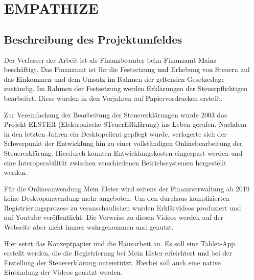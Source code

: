 


\section{EMPATHIZE}\label{EMPATHIZE}
\subsection{Beschreibung des Projektumfeldes}\label{Beschreibung des Projektumfeldes}
Der Verfasser der Arbeit ist als Finanzbeamter beim Finanzamt Mainz beschäftigt.
Das Finanzamt ist für die Festsetzung und Erhebung von Steuern auf das Einkommen und dem Umsatz im Rahmen der geltenden Gesetzeslage zuständig. Im Rahmen der Festsetzung werden Erklärungen der Steuerpflichtigen bearbeitet. Diese wurden in den Vorjahren auf Papiervordrucken erstellt. 

Zur Vereinfachung der Bearbeitung der Steuererklärungen wurde 2003 das Projekt ELSTER (\grq{}Elektronische STeuerERklärung\grq{}) ins Leben gerufen. Nachdem in den letzten Jahren ein Desktopclient gepflegt wurde, verlagerte sich der Schwerpunkt der Entwicklung hin zu einer vollständigen Onlinebearbeitung der Steuererklärung. Hierdurch konnten Entwicklungskosten eingespart werden und eine Interoperabilität zwischen verschiedenen Betriebssystemen hergestellt werden.

Für die Onlineanwendung \grq{}Mein Elster\grq{} wird seitens der Finanzverwaltung ab 2019 keine Desktopanwendung mehr angeboten.
Um den durchaus komplizierten Registrierungsprozess zu veranschaulichen wurden Erklärvideos produziert und auf Youtube veröffentlicht. Die Verweise zu diesen Videos werden auf der Webseite aber nicht immer wahrgenommen und genutzt. 

Hier setzt das Konzeptpapier und die Hausarbeit an. Es soll eine Tablet-App erstellt werden, die die Registrierung bei \grq{}Mein Elster\grq{} erleichtert und bei der Erstellung der Steuererklärung unterstützt. Hierbei soll auch eine native Einbindung der Videos genutzt werden.




